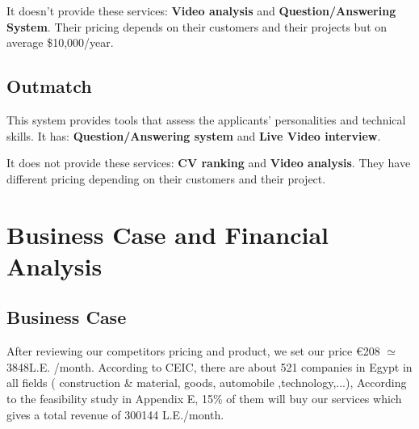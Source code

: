 It doesn't provide these services:
\textbf{Video analysis} and \textbf{Question/Answering System}.
Their pricing depends on their customers and their projects but on average \$10,000/year.\cite{SmartRecruiters Pricing}

\subsection{Outmatch}
This system provides tools that assess the applicants’   personalities and technical skills. It has:
\textbf{Question/Answering system} and \textbf{Live Video interview}. \newline

It does not provide these services:
\textbf{CV ranking} and \textbf{Video analysis}.
They have different pricing depending on their customers and their project.

\section{Business Case and Financial Analysis}




\subsection{Business Case}
After reviewing our competitors pricing and product, we set our price €208 $\simeq$ 3848L.E. /month. According to CEIC, there are about 521 companies in Egypt in all fields ( construction \& material, goods, automobile ,technology,...), According to the feasibility study in Appendix E, 15\% of them will buy our services which gives a total revenue of 300144 L.E./month.

